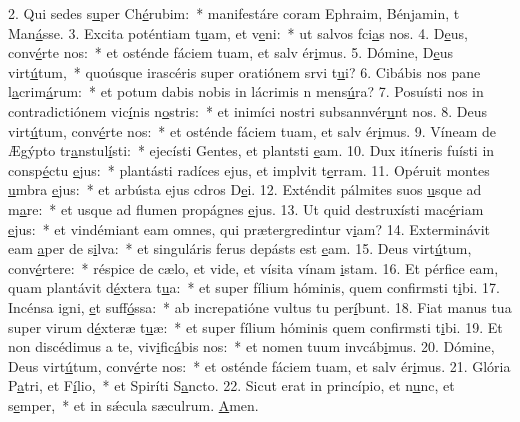 2. Qui sedes s\uline{u}per Ch\uline{é}rubim:~* manifestáre coram Ephraim, Bénjamin, t Man\uline{á}sse.
3. Excita poténtiam t\uline{u}am, et v\uline{e}ni:~* ut salvos fci\uline{a}s nos.
4. D\uline{e}us, conv\uline{é}rte nos:~* et osténde fáciem tuam, et salv ér\uline{i}mus.
5. Dómine, D\uline{e}us virt\uline{ú}tum,~* quoúsque irascéris super oratiónem srvi t\uline{u}i?
6. Cibábis nos pane l\uline{a}crim\uline{á}rum:~* et potum dabis nobis in lácrimis n mens\uline{ú}ra?
7. Posuísti nos in contradictiónem vic\uline{í}nis n\uline{o}stris:~* et inimíci nostri subsannvér\uline{u}nt nos.
8. Deus virt\uline{ú}tum, conv\uline{é}rte nos:~* et osténde fáciem tuam, et salv ér\uline{i}mus.
9. Víneam de Ægýpto tr\uline{a}nstul\uline{í}sti:~* ejecísti Gentes, et plantsti \uline{e}am.
10. Dux itíneris fuísti in consp\uline{é}ctu \uline{e}jus:~* plantásti radíces ejus, et implvit t\uline{e}rram.
11. Opéruit montes \uline{u}mbra \uline{e}jus:~* et arbústa ejus cdros D\uline{e}i.
12. Exténdit pálmites suos \uline{u}sque ad m\uline{a}re:~* et usque ad flumen propágnes \uline{e}jus.
13. Ut quid destruxísti mac\uline{é}riam \uline{e}jus:~* et vindémiant eam omnes, qui prætergredintur v\uline{i}am?
14. Exterminávit eam \uline{a}per de s\uline{i}lva:~* et singuláris ferus depásts est \uline{e}am.
15. Deus virt\uline{ú}tum, conv\uline{é}rtere:~* réspice de cælo, et vide, et vísita vínam \uline{i}stam.
16. Et pérfice eam, quam plantávit d\uline{é}xtera t\uline{u}a:~* et super fílium hóminis, quem confirmsti t\uline{i}bi.
17. Incénsa igni, \uline{e}t suff\uline{ó}ssa:~* ab increpatióne vultus tu per\uline{í}bunt.
18. Fiat manus tua super virum d\uline{é}xteræ t\uline{u}æ:~* et super fílium hóminis quem confirmsti t\uline{i}bi.
19. Et non discédimus a te, viv\uline{i}fic\uline{á}bis nos:~* et nomen tuum invcáb\uline{i}mus.
20. Dómine, Deus virt\uline{ú}tum, conv\uline{é}rte nos:~* et osténde fáciem tuam, et salv ér\uline{i}mus.
21. Glória P\uline{a}tri, et F\uline{í}lio,~* et Spiríti S\uline{a}ncto.
22. Sicut erat in princípio, et n\uline{u}nc, et s\uline{e}mper,~* et in sǽcula sæculrum. \uline{A}men.
